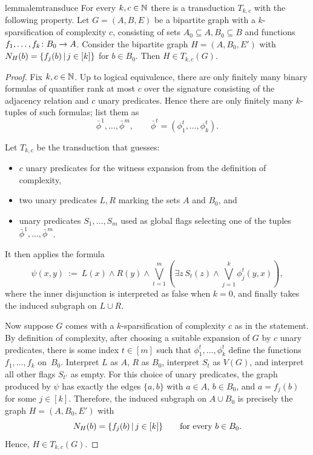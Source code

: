 \begin{restatable}%
  {lemma}{lemtransduce}\label{lem:transduce}
  For every $k,c\in\mathbb{N}$ there is a transduction $T_{k,c}$ with the following property.
  Let $G=(A,B,E)$ be a bipartite graph with a $k$-sparsification 
   of complexity $c$, consisting of sets 
   $A_0\subseteq A,B_0\subseteq B$ and functions $f_1,\ldots,f_k\colon B_0\to A$.
   Consider the bipartite graph $H=(A,B_0,E')$
with $N_H(b)=\{f_j(b) \,|\, j\in[k] \}$ for $b\in B_0$.
Then $H\in T_{k,c}(G)$.
\end{restatable}
\begin{proof}
Fix $k,c\in\mathbb{N}$.
Up to logical equivalence, there are only finitely many binary formulas of
quantifier rank at most $c$ over the signature consisting of the adjacency
relation and $c$ unary predicates.
Hence there are only finitely many $k$-tuples of such formulas; list them as
\[
  \bar\phi^1,\ldots,\bar\phi^m,
  \qquad
  \bar\phi^t=(\phi^t_1,\ldots,\phi^t_k).
\]

Let $T_{k,c}$ be the transduction that guesses:
\begin{itemize}
  \item $c$ unary predicates for the witness expansion from the definition of complexity,
  \item two unary predicates $L,R$ marking the sets $A$ and $B_0$, and
  \item unary predicates $S_1,\ldots,S_m$ used as global flags selecting one
  of the tuples $\bar\phi^1,\ldots,\bar\phi^m$.
\end{itemize}
It then applies the formula
\[
  \psi(x,y)\ :=\ L(x)\land R(y)\land
  \bigvee_{t=1}^m\left(\exists z\,S_t(z)\land \bigvee_{j=1}^k\phi_j^t(y,x)\right),
\]
where the inner disjunction is interpreted as false when $k=0$,
and finally takes the induced subgraph on $L\cup R$.

Now suppose $G$ comes with a $k$-sparsification of complexity $c$ as in the
statement.
By definition of complexity, after choosing a suitable expansion of $G$ by
$c$ unary predicates, there is some index $t\in[m]$ such that
$\phi_1^t,\ldots,\phi_k^t$ define the functions $f_1,\ldots,f_k$ on~$B_0$.
Interpret $L$ as $A$, $R$ as $B_0$, interpret $S_t$ as $V(G)$, and interpret
all other flags $S_{t'}$ as empty.
For this choice of unary predicates, the graph produced by $\psi$ has exactly
the edges $\{a,b\}$ with $a\in A$, $b\in B_0$, and $a=f_j(b)$ for some $j\in[k]$.
Therefore, the induced subgraph on $A\cup B_0$ is precisely the graph
$H=(A,B_0,E')$ with
\[
  N_H(b)=\{f_j(b) \,|\, j\in[k] \}
  \qquad\text{for every }b\in B_0.
\]
Hence, $H\in T_{k,c}(G)$.
\end{proof}

